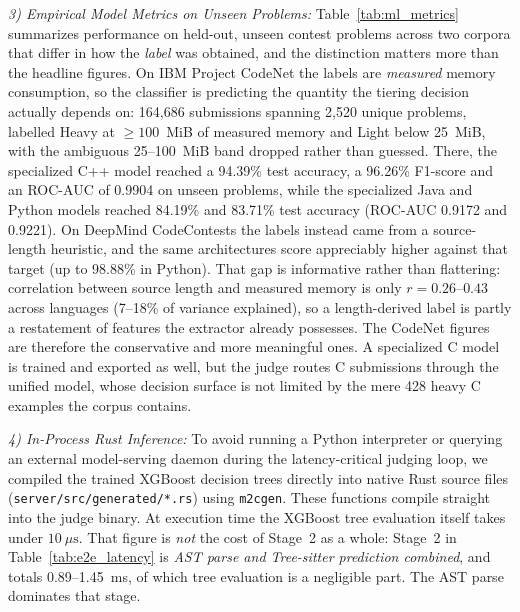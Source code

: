 \documentclass[conference]{IEEEtran}
\begin{document}
\textit{3) Empirical Model Metrics on Unseen Problems:}
Table~\ref{tab:ml_metrics} summarizes performance on held-out, unseen contest problems across two corpora that differ in how the \emph{label} was obtained, and the distinction matters more than the headline figures. On IBM Project CodeNet the labels are \emph{measured} memory consumption, so the classifier is predicting the quantity the tiering decision actually depends on: 164,686 submissions spanning 2,520 unique problems, labelled Heavy at $\ge 100$~MiB of measured memory and Light below 25~MiB, with the ambiguous 25--100~MiB band dropped rather than guessed. There, the specialized C++ model reached a 94.39\% test accuracy, a 96.26\% F1-score and an ROC-AUC of 0.9904 on unseen problems, while the specialized Java and Python models reached 84.19\% and 83.71\% test accuracy (ROC-AUC 0.9172 and 0.9221). On DeepMind CodeContests the labels instead came from a source-length heuristic, and the same architectures score appreciably higher against that target (up to 98.88\% in Python). That gap is informative rather than flattering: correlation between source length and measured memory is only $r = 0.26$--$0.43$ across languages (7--18\% of variance explained), so a length-derived label is partly a restatement of features the extractor already possesses. The CodeNet figures are therefore the conservative and more meaningful ones. A specialized C model is trained and exported as well, but the judge routes C submissions through the unified model, whose decision surface is not limited by the mere 428 heavy C examples the corpus contains.


\textit{4) In-Process Rust Inference:}
To avoid running a Python interpreter or querying an external model-serving daemon during the latency-critical judging loop, we compiled the trained XGBoost decision trees directly into native Rust source files (\texttt{server/src/generated/*.rs}) using \texttt{m2cgen}. These functions compile straight into the judge binary. At execution time the XGBoost tree evaluation itself takes under $10\ \mu\text{s}$. That figure is \emph{not} the cost of Stage~2 as a whole: Stage~2 in Table~\ref{tab:e2e_latency} is \emph{AST parse and Tree-sitter prediction combined}, and totals 0.89--1.45~ms, of which tree evaluation is a negligible part. The AST parse dominates that stage.
\end{document}
